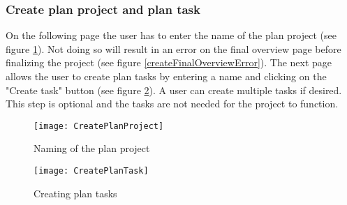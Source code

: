 \subsubsection{Create plan project and plan task}
On the following page the user has to enter the name of the plan project (see figure \ref{createPlanProject}). Not doing so will result in an error on the final overview page before finalizing the project (see figure \ref{createFinalOverviewError}). The next page allows the user to create plan tasks by entering a name and clicking on the "Create task" button (see figure \ref{createPlanTask}). A user can create multiple tasks if desired. This step is optional and the tasks are not needed for the project to function.

\begin{figure}[H]
	\centering
	\texttt{[image: CreatePlanProject]}
	\caption{Naming of the plan project}
	\label{createPlanProject}
\end{figure}
\begin{figure}[H]
	\centering
	\texttt{[image: CreatePlanTask]}
	\caption{Creating plan tasks}
	\label{createPlanTask}
\end{figure}

